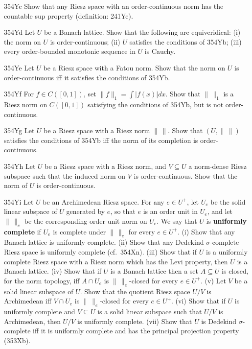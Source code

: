 {\spheader 354Yc Show that any Riesz space with an order-continuous norm
has the countable sup property (definition:  241Ye).

\spheader 354Yd Let $U$ be a Banach lattice.   Show that the following
are equiveridical:  (i) the norm on $U$ is order-continuous;  (ii) $U$
satisfies the conditions of 354Yb;   (iii) every order-bounded monotonic
sequence in $U$ is Cauchy.

\spheader 354Ye Let $U$ be a Riesz space with a Fatou norm.   Show that
the norm on $U$ is order-continuous iff it satisfies the conditions of
354Yb.

\spheader 354Yf For $f\in C([0,1])$, set $\|f\|_1=\int|f(x)|dx$.   Show
that $\|\,\|_1$ is a Riesz norm on $C([0,1])$ satisfying the conditions
of 354Yb, but is not order-continuous.

\spheader 354Yg Let $U$ be a Riesz space with a Riesz norm $\|\,\|$.
Show that $(U,\|\,\|)$ satisfies the conditions of 354Yb iff the norm of
its completion is order-continuous.

\spheader 354Yh Let $U$ be a Riesz space with a Riesz norm, and
$V\subseteq U$ a norm-dense Riesz subspace such that the induced norm on
$V$ is order-continuous.   Show that the norm of $U$ is
order-continuous.   

\spheader 354Yi Let $U$ be an Archimedean Riesz space.   For any
$e\in U^+$, let $U_e$ be the solid linear subspace of $U$ generated by
$e$, so that $e$ is an order unit in $U_e$, and let $\|\,\|_e$ be the
corresponding order-unit norm on $U_e$.   We say that $U$ is {\bf
uniformly complete} if $U_e$ is complete under $\|\,\|_e$ for every
$e\in U^+$.   (i) Show that any Banach lattice is uniformly complete.
(ii) Show that any Dedekind $\sigma$-complete Riesz space is uniformly
complete (cf.\ 354Xn).   (iii) Show that if $U$ is a uniformly complete
Riesz space with a Riesz norm which has the Levi property, then $U$ is a
Banach lattice.   (iv) Show that if $U$ is a Banach lattice then a set
$A\subseteq U$ is closed, for the norm topology, iff $A\cap U_e$ is
$\|\,\|_e$-closed for every $e\in U^+$.   (v) Let $V$ be a solid linear
subspace of $U$.   Show that the quotient Riesz space $U/V$ is
Archimedean iff $V\cap U_e$ is $\|\,\|_e$-closed for every $e\in U^+$.
(vi) Show that if $U$ is uniformly complete and $V\subseteq U$ is a
solid linear subspace such that $U/V$ is Archimedean, then $U/V$ is
uniformly complete.   (vii) Show that $U$ is Dedekind $\sigma$-complete
iff it is uniformly complete and has the principal projection property
(353Xb).   

}
